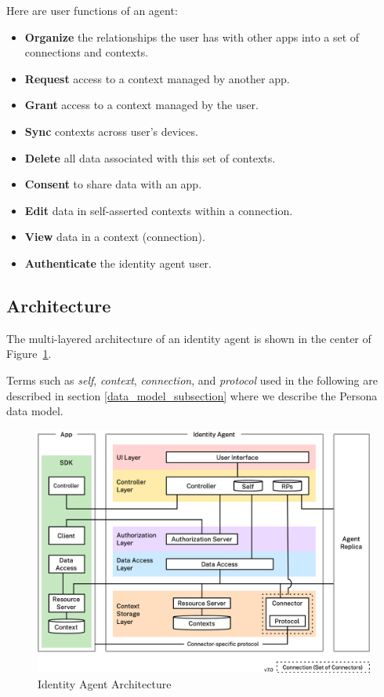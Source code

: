 \documentclass[11pt, oneside]{article}   	%
\begin{document}
Here are user functions of an agent:

\begin{itemize}
\item \textbf{Organize} the relationships the user has with other apps into a set of connections and contexts.
\item \textbf{Request} access to a context managed by another app.
\item \textbf{Grant} access to a context managed by the user.
\item \textbf{Sync} contexts across user's devices.
\item \textbf{Delete} all data associated with this set of contexts.
\item \textbf{Consent} to share data with an app.
\item \textbf{Edit} data in self-asserted contexts within a connection.
\item \textbf{View} data in a context (connection).
\item \textbf{Authenticate} the identity agent user.
\end{itemize}

\subsection{Architecture}

The multi-layered architecture of an identity agent is shown in the center of Figure~\ref{fig:architecture}. 

Terms such as \emph{self}, \emph{context}, \emph{connection}, and \emph{protocol} used in the following are described in section \ref{data_model_subsection} where we describe the Persona data model.

\begin{figure}[htbp]
\includegraphics[width=\textwidth]{./images/architecture.png}
\caption{Identity Agent Architecture}
\label{fig:architecture}
\end{figure}
\end{document}
